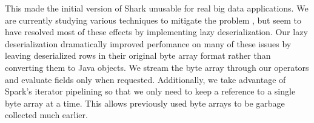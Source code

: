 This made the initial version of Shark unusable for real big data applications. We are currently studying various techniques to mitigate the problem \cite{hbase-gc}, but seem to have resolved most of these effects by implementing lazy deserialization. Our lazy deserialization dramatically improved perfomance on many of these issues by leaving deserialized rows in their original byte array format rather than converting them to Java objects. We stream the byte array through our operators and evaluate fields only when requested. Additionally, we take advantage of Spark's iterator pipelining so that we only need to keep a reference to a single byte array at a time. This allows previously used byte arrays to be garbage collected much earlier.







